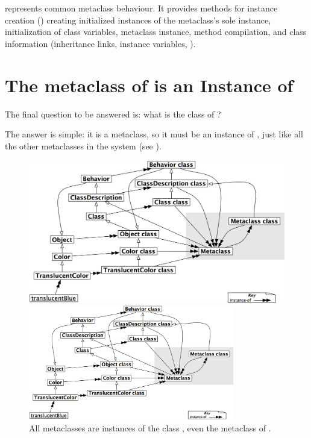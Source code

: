 \documentclass[a4paper,10pt,twoside]{book}
\begin{document}
 represents common metaclass behaviour.
It provides methods for instance creation ()
creating initialized instances of the metaclass's sole instance,
initialization of class variables,
metaclass instance,
method compilation, %
and class information (inheritance links, instance variables, \etc).

\section{The metaclass of  is an Instance of }

The final question to be answered is: what is the class of ?

The answer is simple: it is a metaclass, so it must be an instance of , just like all the other metaclasses in the system (see ).

\begin{center}
\begin{figure}
\ifluluelse
	{\centerline{\includegraphics[width=\textwidth]{TranslucentMetaclassClassClass}}}
	{\centerline{\includegraphics[width=0.8\textwidth]{TranslucentMetaclassClassClass}}}
\caption{All metaclasses are instances of the class , even the metaclass of .\label{fig:metaclassclassclass}}
\end{figure}
\end{center}
\end{document}
